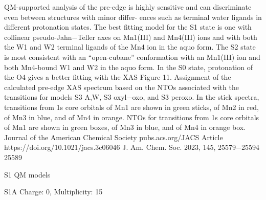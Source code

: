 \documentclass{article}
\begin{document}
QM-supported analysis of the pre-edge is highly sensitive and
can discriminate even between structures with minor differ-
ences such as terminal water ligands in different protonation
states. The best fitting model for the S1 state is one with
collinear pseudo-Jahn−Teller axes on Mn1(III) and Mn4(III)
ions and with both the W1 and W2 terminal ligands of the
Mn4 ion in the aquo form. The S2 state is most consistent with
an “open-cubane” conformation with an Mn1(III) ion and
both Mn4-bound W1 and W2 in the aquo form. In the S0 state,
protonation of the O4 gives a better fitting with the XAS
Figure 11. Assignment of the calculated pre-edge XAS spectrum based on the NTOs associated with the transitions for models S3
A,W, S3
oxyl−oxo, and
S3
peroxo. In the stick spectra, transitions from 1s core orbitals of Mn1 are shown in green sticks, of Mn2 in red, of Mn3 in blue, and of Mn4 in
orange. NTOs for transitions from 1s core orbitals of Mn1 are shown in green boxes, of Mn3 in blue, and of Mn4 in orange box.
Journal of the American Chemical Society
pubs.acs.org/JACS
Article
https://doi.org/10.1021/jacs.3c06046
J. Am. Chem. Soc. 2023, 145, 25579−25594
25589

\newpage
S1 QM models  
   
S1A   Charge: 0, Multiplicity: 15
   
\end{document}
